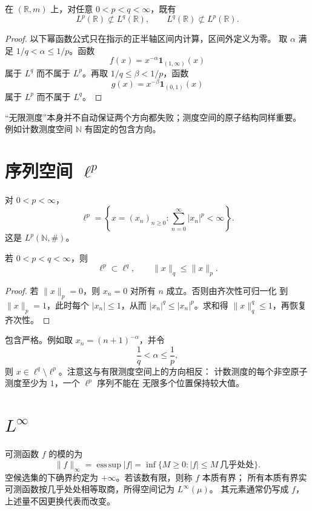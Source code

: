 \begin{proposition}
\label{prop:infinite-measure-no-lp-inclusion}
在 \((\mathbb R,m)\) 上，对任意 \(0<p<q<\infty\)，既有
\[
 L^p(\mathbb R)\not\subset L^q(\mathbb R),
 \qquad
 L^q(\mathbb R)\not\subset L^p(\mathbb R).
\]
\end{proposition}

\begin{proof}
以下幂函数公式只在指示的正半轴区间内计算，区间外定义为零。
取 \(\alpha\) 满足 \(1/q<\alpha\le1/p\)。函数
\[
 f(x)=x^{-\alpha}\mathbf1_{(1,\infty)}(x)
\]
属于 \(L^q\) 而不属于 \(L^p\)。再取
\(1/q\le\beta<1/p\)，函数
\[
 g(x)=x^{-\beta}\mathbf1_{(0,1)}(x)
\]
属于 \(L^p\) 而不属于 \(L^q\)。
\end{proof}

“无限测度”本身并不自动保证两个方向都失败；测度空间的原子结构同样重要。
例如计数测度空间 \(\mathbb N\) 有固定的包含方向。

\section{序列空间 \texorpdfstring{\(\ell^p\)}{ell-p}}

对 \(0<p<\infty\)，
\[
 \ell^p
 =\left\{x=(x_n)_{n\ge0}:\sum_{n=0}^{\infty}|x_n|^p<\infty\right\}.
\]
这是 \(L^p(\mathbb N,\#)\)。

\begin{theorem}
\label{thm:ellp-inclusion}
若 \(0<p<q<\infty\)，则
\[
 \ell^p\subset\ell^q,\qquad
 \|x\|_q\le\|x\|_p.
\]
\end{theorem}

\begin{proof}
若 \(\|x\|_p=0\)，则 \(x_n=0\) 对所有 \(n\) 成立。否则由齐次性可归一化
到 \(\|x\|_p=1\)，此时每个
\(|x_n|\le1\)，从而 \(|x_n|^q\le|x_n|^p\)。求和得
\(\|x\|_q^q\le1\)，再恢复齐次性。
\end{proof}

包含严格。例如取 \(x_n=(n+1)^{-\alpha}\)，并令
\[
 \frac1q<\alpha\le\frac1p,
\]
则 \(x\in\ell^q\setminus\ell^p\)。注意这与有限测度空间上的方向相反：
计数测度的每个非空原子测度至少为 \(1\)，一个 \(\ell^p\) 序列不能在
无限多个位置保持较大值。

\section{\texorpdfstring{\(L^\infty\)}{L-infinity}}

\begin{definition}
可测函数 \(f\) 的模的为
\[
 \|f\|_\infty
 =\operatorname*{ess\,sup}|f|
 =\inf\{M\ge0:|f|\le M\ \text{几乎处处}\}.
\]
空候选集的下确界约定为 \(+\infty\)。若该数有限，则称 \(f\) 本质有界；
所有本质有界实可测函数按几乎处处相等取商，所得空间记为 \(L^\infty(\mu)\)。
其元素通常仍写成 \(f\)，上述量不因更换代表而改变。
\end{definition}

